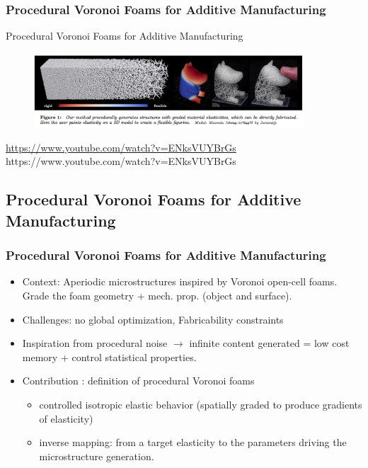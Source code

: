 \frame
{
	\frametitle{Procedural Voronoi Foams for Additive Manufacturing}
	
	Procedural Voronoi Foams for Additive Manufacturing \cite{Martinez:2016}
	\begin{figure}
		\centering
		\includegraphics[width=0.9\textwidth]{img/voronoi/headline.png}
	\end{figure}
	\centering
	\small{\url{https://www.youtube.com/watch?v=ENksVUYBrGs}}
	https://www.youtube.com/watch?v=ENksVUYBrGs
}

\subsection{Procedural Voronoi Foams for Additive Manufacturing}
\frame
{
	\frametitle{Procedural Voronoi Foams for Additive Manufacturing}
	
	\begin{itemize}[<+->]
		\item Context: Aperiodic microstructures inspired by Voronoi open-cell foams.
		Grade the foam geometry + mech. prop. (object and surface).
		
		\item Challenges: no global optimization, Fabricability constraints
		
		\item Inspiration from procedural noise $\rightarrow$ infinite content generated = low cost memory + control statistical properties.
		\item Contribution : definition of procedural Voronoi foams
		\begin{itemize}
			\item controlled isotropic elastic behavior (spatially graded to produce gradients of elasticity)
			\item inverse mapping: from a target elasticity to the parameters driving the microstructure generation.
		\end{itemize}
		
	\end{itemize}
}



